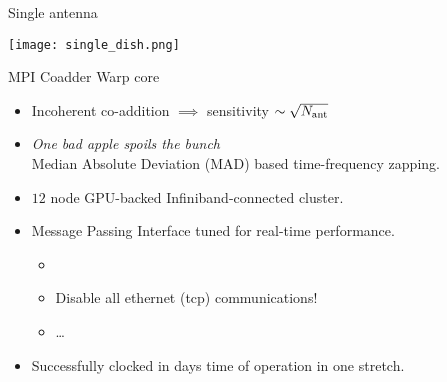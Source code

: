 
\begin{frame}{Single antenna}
	\texttt{[image: single\_dish.png]}
\end{frame}

\begin{frame}{MPI Coadder \hfill Warp core}
	\begin{itemize}
		\item Incoherent co-addition $\implies$ sensitivity $\sim \sqrt{N_{\rm ant}}$
		\item \emph{One bad apple spoils the bunch} \\
			Median Absolute Deviation (MAD) based time-frequency zapping.
		\item $12$ node GPU-backed Infiniband-connected cluster.
		\item Message Passing Interface tuned for real-time performance.
			\begin{itemize}
				\item {}
				\item Disable all ethernet (tcp) communications!
				\item \dots
			\end{itemize}
		\item Successfully clocked in days time of operation in one stretch.
	\end{itemize}
\end{frame}

